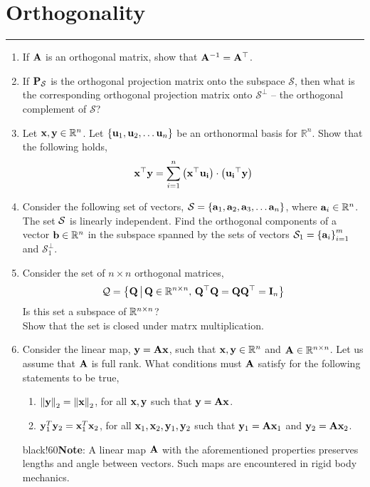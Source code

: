 \documentclass[
11pt, %
a4paper, %
oneside, %
headinclude,footinclude, %
BCOR5mm, %
]{scrartcl}
\def\mf{\ensuremath\mathbf}
\def\mb{\ensuremath\mathbb}
\begin{document}
\section{Orthogonality}
\hrule
\vspace{0.5cm}
\begin{enumerate}
	\item If $\mf{A}$ is an orthogonal matrix, show that $\mf{A}^{-1} = \mf{A}^\top$.
	
	\item If $\mf{P}_{\mathcal{S}}$ is the orthogonal projection matrix onto the subspace $\mathcal{S}$, then what is the corresponding orthogonal projection matrix onto $\mathcal{S}^{\perp}$ -- the orthogonal complement of $\mathcal{S}$?
	
	\item Let $\mf{x}, \mf{y} \in \mathbb{R}^n$. Let $\cc{\mf{u}_1, \mf{u}_2, \ldots \mf{u}_n}$ be an orthonormal basis for $\mathbb{R}^n$. Show that the following holds,
	\[ \mf{x}^\top\mf{y} = \sum_{i=1}^n \pp{\mf{x}^\top \mf{u_i}} \cdot \pp{\mf{u_i}^\top \mf{y}} \]
	
	\item Consider the following set of vectors, $\mathcal{S} = \left\{ \mf{a}_1, \mf{a}_2, \mf{a}_3, \ldots \mf{a}_n \right\}$, where $\mf{a}_i \in \mathbb{R}^n$. The set $\mathcal{S}$ is linearly independent. Find the orthogonal components of a vector $\mf{b} \in \mathbb{R}^n$ in the subspace spanned by the sets of vectors $\mathcal{S}_1 = \left\{ \mf{a}_i \right\}_{i=1}^m$ and $\mathcal{S}_1^\perp$.
	
	\item Consider the set of $n \times n$ orthogonal matrices,
	\[ \mc{Q} = \left\{ \mf{Q} \, \big \vert \, \mf{Q} \in \mb{R}^{n \times n}, \, \mf{Q}^\top\mf{Q} = \mf{Q}\mf{Q}^\top = \mf{I}_n  \right\} \] 
	Is this set a subspace of $\mb{R}^{n \times n}$? \\
	Show that the set is closed under matrx multiplication.
	
    \item Consider the linear map, $\mf{y} = \mf{Ax}$, such that $\mf{x}, \mf{y} \in \mb{R}^n$ and $\mf{A} \in \mb{R}^{n \times n}$. Let us assume that $\mf{A}$ is full rank. What conditions must $\mf{A}$ satisfy for the following statements to be true,
    \begin{enumerate}
        \item $\left\lVert \mf{y}\right\rVert_2 = \left\lVert \mf{x}\right\rVert_2$, for all $\mf{x}, \mf{y}$ such that $\mf{y} = \mf{Ax}$.
        \item $\mf{y}_1^T\mf{y}_2 = \mf{x}_1^T\mf{x}_2$, for all $\mf{x}_1, \mf{x}_2, \mf{y}_1, \mf{y}_2$ such that $\mf{y}_1 = \mf{A}\mf{x}_1$ and $\mf{y}_2 = \mf{A}\mf{x}_2$. 
    \end{enumerate}
    \vspace{-0.1cm}
    \begin{color}{black!60}\small{\textbf{Note}: A linear map $\mf{A}$ with the aforementioned properties preserves lengths and angle between vectors. Such maps are encountered in rigid body mechanics.}
    \end{color}
\end{enumerate}
\end{document}

